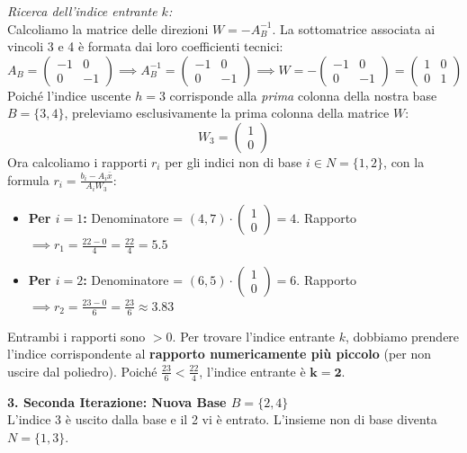\documentclass[12pt, a4paper]{article}
\begin{document}
	\textit{Ricerca dell'indice entrante $k$:}\\
	Calcoliamo la matrice delle direzioni $W = -A_B^{-1}$. La sottomatrice associata ai vincoli 3 e 4 è formata dai loro coefficienti tecnici:
	\[
	A_B = \begin{pmatrix} -1 & 0 \\ 0 & -1 \end{pmatrix} \implies A_B^{-1} = \begin{pmatrix} -1 & 0 \\ 0 & -1 \end{pmatrix} \implies W = -\begin{pmatrix} -1 & 0 \\ 0 & -1 \end{pmatrix} = \begin{pmatrix} 1 & 0 \\ 0 & 1 \end{pmatrix}
	\]
	Poiché l'indice uscente $h=3$ corrisponde alla \textit{prima} colonna della nostra base $B=\{3,4\}$, preleviamo esclusivamente la prima colonna della matrice $W$:
	\[
	W_3 = \begin{pmatrix} 1 \\ 0 \end{pmatrix}
	\]
	Ora calcoliamo i rapporti $r_i$ per gli indici non di base $i \in N = \{1, 2\}$, con la formula $r_i = \frac{b_i - A_i \bar{x}}{A_i W_3}$:
	\begin{itemize}[label=$\circ$, itemsep=4pt, leftmargin=1.5cm]
		\item \textbf{Per $i=1$:} Denominatore = $(4, 7) \cdot \begin{pmatrix} 1 \\ 0 \end{pmatrix} = 4$. Rapporto $\implies r_1 = \frac{22 - 0}{4} = \frac{22}{4} = 5.5$
		\item \textbf{Per $i=2$:} Denominatore = $(6, 5) \cdot \begin{pmatrix} 1 \\ 0 \end{pmatrix} = 6$. Rapporto $\implies r_2 = \frac{23 - 0}{6} = \frac{23}{6} \approx 3.83$
	\end{itemize}
	Entrambi i rapporti sono $> 0$. Per trovare l'indice entrante $k$, dobbiamo prendere l'indice corrispondente al \textbf{rapporto numericamente più piccolo} (per non uscire dal poliedro). Poiché $\frac{23}{6} < \frac{22}{4}$, l'indice entrante è $\mathbf{k = 2}$.
	
	\vspace{0.4cm}
	\textbf{3. Seconda Iterazione: Nuova Base $B = \{2, 4\}$}\\
	L'indice 3 è uscito dalla base e il 2 vi è entrato. L'insieme non di base diventa $N = \{1, 3\}$.
	
\end{document}

